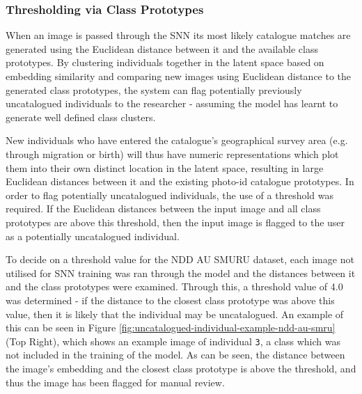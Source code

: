 \subsubsection{Thresholding via Class Prototypes}\label{ch:ID,sec:ModelSelection,subsec:UncataloguedIndividualThresholding,subsub:prototypes}

When an image is passed through the SNN its most likely catalogue matches are generated using the Euclidean distance between it and the available class prototypes. By clustering individuals together in the latent space based on embedding similarity and comparing new images using Euclidean distance to the generated class prototypes, the system can flag potentially previously uncatalogued individuals to the researcher - assuming the model has learnt to generate well defined class clusters. 

New individuals who have entered the catalogue's geographical survey area (e.g. through migration or birth) will thus have numeric representations which plot them into their own distinct location in the latent space, resulting in large Euclidean distances between it and the existing photo-id catalogue prototypes. In order to flag potentially uncatalogued individuals, the use of a threshold was required. If the Euclidean distances between the input image and all class prototypes are above this threshold, then the input image is flagged to the user as a potentially uncatalogued individual. 

To decide on a threshold value for the NDD AU SMURU dataset, each image not utilised for SNN training was ran through the model and the distances between it and the class prototypes were examined. Through this, a threshold value of 4.0 was determined - if the distance to the closest class prototype was above this value, then it is likely that the individual may be uncatalogued. An example of this can be seen in Figure \ref{fig:uncatalogued-individual-example-ndd-au-smru} (Top Right), which shows an example image of individual \texttt{3}, a class which was not included in the training of the model. As can be seen, the distance between the image's embedding and the closest class prototype is above the threshold, and thus the image has been flagged for manual review.

